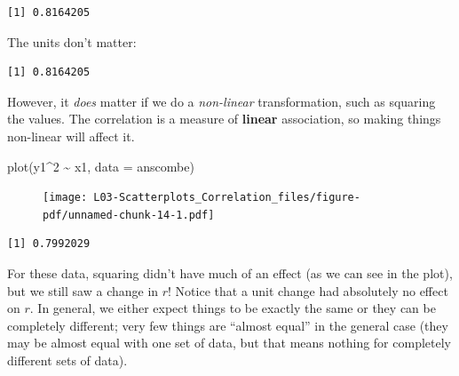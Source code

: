 \documentclass[
  letterpaper,
  DIV=11,
  numbers=noendperiod,
  oneside]{scrreprt}
\newenvironment{Shaded}{\begin{snugshade}}{\end{snugshade}}
\newcommand{\AttributeTok}[1]{\textcolor[rgb]{0.40,0.45,0.13}{#1}}
\newcommand{\DecValTok}[1]{\textcolor[rgb]{0.68,0.00,0.00}{#1}}
\newcommand{\FunctionTok}[1]{\textcolor[rgb]{0.28,0.35,0.67}{#1}}
\newcommand{\NormalTok}[1]{\textcolor[rgb]{0.00,0.23,0.31}{#1}}
\newcommand{\SpecialCharTok}[1]{\textcolor[rgb]{0.37,0.37,0.37}{#1}}
\begin{document}
\begin{verbatim}
[1] 0.8164205
\end{verbatim}

The units don't matter:

\begin{Shaded}
\end{Shaded}

\begin{verbatim}
[1] 0.8164205
\end{verbatim}

However, it \emph{does} matter if we do a \emph{non-linear}
transformation, such as squaring the values. The correlation is a
measure of \textbf{linear} association, so making things non-linear will
affect it.

\begin{Shaded}
\begin{Highlighting}[]
\FunctionTok{plot}\NormalTok{(y1}\SpecialCharTok{\^{}}\DecValTok{2} \SpecialCharTok{\textasciitilde{}}\NormalTok{ x1, }\AttributeTok{data =}\NormalTok{ anscombe)}
\end{Highlighting}
\end{Shaded}

\begin{figure}[H]

{\centering \texttt{[image: L03-Scatterplots\_Correlation\_files/figure-pdf/unnamed-chunk-14-1.pdf]}

}

\end{figure}

\begin{Shaded}
\end{Shaded}

\begin{verbatim}
[1] 0.7992029
\end{verbatim}

For these data, squaring didn't have much of an effect (as we can see in
the plot), but we still saw a change in \(r\)! Notice that a unit change
had absolutely no effect on \(r\). In general, we either expect things
to be exactly the same or they can be completely different; very few
things are ``almost equal'' in the general case (they may be almost
equal with one set of data, but that means nothing for completely
different sets of data).
\end{document}
